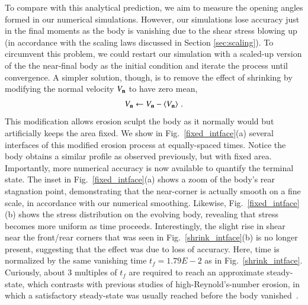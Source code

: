 \documentclass[preprint, 10pt]{elsarticle}
\begin{document}
To compare with this analytical prediction, we aim to measure the opening angles formed in our numerical simulations. However, our simulations lose accuracy just in the final moments as the body is vanishing due to the shear stress blowing up (in accordance with the scaling laws discussed in Section \ref{sec:scaling}). To circumvent this problem, we could restart our simulation with a scaled-up version of the the near-final  body as the initial condition and iterate the process until convergence. A simpler solution, though, is to remove the effect of shrinking by modifying the normal velocity $V_{\mathbf{n}}$ to have zero mean,
\begin{align*}
  V_{\mathbf{n}} \leftarrow V_{\mathbf{n}} - \left< V_{\mathbf{n}} \right> \, .
\end{align*}
This modification allows erosion sculpt the body as it normally would but artificially keeps the area fixed. We show in Fig.~\ref{fixed_intface}(a) several interfaces of this modified erosion process at equally-spaced times. Notice the body obtains a similar profile as observed previously, but with fixed area. Importantly, more numerical accuracy is now available to quantify the terminal state. The inset in Fig.~\ref{fixed_intface}(a) shows a zoom of the body's rear stagnation point, demonstrating that the near-corner is actually smooth on a fine scale, in accordance with our numerical smoothing. 
Likewise, Fig.~\ref{fixed_intface}(b) shows the stress distribution on the evolving body, revealing that stress becomes more uniform as time proceeds. Interestingly, the slight rise in shear near the front/rear corners that was seen in Fig.~\ref{shrink_intface}(b) is no longer present, suggesting that the effect was due to loss of accuracy.
Here, time is normalized by the same vanishing time $t_f = 1.79E-2$ as in Fig.~\ref{shrink_intface}. Curiously, about 3 multiples of $t_f$ are required to reach an approximate steady-state, which contrasts with previous studies of high-Reynold's-number erosion, in which a satisfactory steady-state was usually reached before the body vanished~\cite{moo-ris-chi-zha-she2013}.
\end{document}
